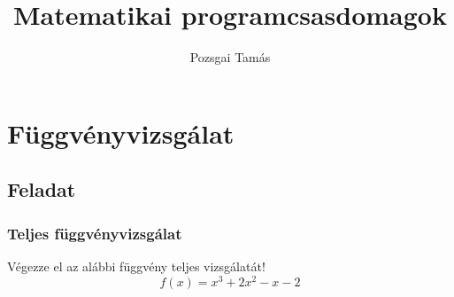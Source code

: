 \documentclass[ignorenonframetext]{beamer}
\title{Matematikai programcsasdomagok}
\author{Pozsgai Tamás}
\institute[Pannon Egyetem]{}
\begin{document}

\frame{\titlepage} %


\frame{
	\tableofcontents
}

\section{Függvényvizsgálat}
\subsection{Feladat}
\begin{frame}[fragile]
\frametitle{Teljes függvényvizsgálat}
Végezze el az alábbi függvény teljes vizsgálatát!
\[
f(x)=x^3+2x^2-x-2 
\]

\end{frame}
\end{document}
